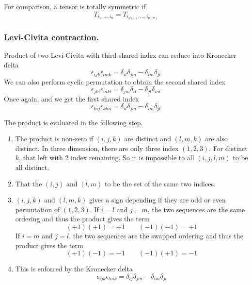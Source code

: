 \documentclass[../../../main.tex]{subfiles}
\begin{document}
For comparison, a tensor is totally symmetric if
\begin{equation*}
  T_{i_1,\dots, i_n} = 
  T_{i_{p(1)},\dots, i_{p(n)}} 
\end{equation*}

\subsubsection{Levi-Civita contraction.}
Product of two Levi-Civita with third shared index can reduce into Kronecker delta
\begin{equation*}
  \epsilon_{ijk}\epsilon_{lmk} = \delta_{il } \delta_{jm} - \delta_{im } \delta_{jl}
\end{equation*}
We can also perform cyclic permutation to obtain the second shared index
\begin{equation*}
\epsilon_{jki}\epsilon_{mkl} = \delta_{jm} \delta_{il} - \delta_{jl} \delta_{im}
\end{equation*}
Once again, and we get the first shared index
\begin{equation*}
\epsilon_{kij}\epsilon_{klm} = \delta_{il} \delta_{jm} - \delta_{im} \delta_{jl}
\end{equation*}

The product is evaluated in the following step.
\begin{enumerate}
  \item The product is non-zero if $(i,j,k)$ are distinct and $(l,m,k)$  are also distinct. In three dimension, there are only three index $(1,2,3)$. For distinct $k$, that left with 2 index remaining. So it is impossible to all $(i,j,l,m)$ to be all distinct.  
  \item That the $(i,j)$ and $(l,m)$ to be the set of the same two indices.
  \item $(i,j,k)$ and $(l,m,k)$ gives a sign depending if they are odd or even permutation of $(1,2,3)$. If $i=l$ and $j=m$, the two sequences are the same ordering and thus the product gives the term
  \begin{equation*}
    (+1)(+1)=+1\qquad
    (-1)(-1)=+1
  \end{equation*}
  If $i=m$ and $j=l$, the two sequences are the swapped ordering and thus  the product gives the term
  \begin{equation*}
    (+1)(-1)=-1\qquad
    (-1)(+1)=-1
  \end{equation*}
\item This is enforced by the Kronecker delta
\begin{equation*}
  \epsilon_{ijk}\epsilon_{lmk} = \delta_{ij } \delta_{jm} - \delta_{im } \delta_{jl}
\end{equation*}
\end{enumerate}
\end{document}
